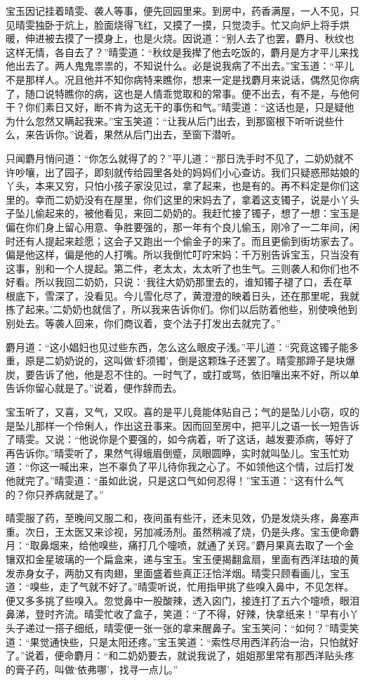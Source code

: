 \documentclass[12pt,oneside]{book}
\begin{document}
宝玉因记挂着晴雯、袭人等事，便先回园里来。到房中，药香满屋，一人不见，只见晴雯独卧于炕上，脸面烧得飞红，又摸了一摸，只觉烫手。忙又向炉上将手烘暖，伸进被去摸了一摸身上，也是火烧。因说道：“别人去了也罢，麝月、秋纹也这样无情，各自去了？”晴雯道：“秋纹是我撵了他去吃饭的，麝月是方才平儿来找他出去了。两人鬼鬼祟祟的，不知说什么。必是说我病了不出去。”宝玉道：“平儿不是那样人。况且他并不知你病特来瞧你，想来一定是找麝月来说话，偶然见你病了，随口说特瞧你的病，这也是人情乖觉取和的常事。便不出去，有不是，与他何干？你们素日又好，断不肯为这无干的事伤和气。”晴雯道：“这话也是，只是疑他为什么忽然又瞒起我来。”宝玉笑道：“让我从后门出去，到那窗根下听听说些什么，来告诉你。”说着，果然从后门出去，至窗下潜听。

只闻麝月悄问道：“你怎么就得了的？”平儿道：“那日洗手时不见了，二奶奶就不许吵嚷，出了园子，即刻就传给园里各处的妈妈们小心查访。我们只疑惑邢姑娘的丫头，本来又穷，只怕小孩子家没见过，拿了起来，也是有的。再不料定是你们这里的。幸而二奶奶没有在屋里，你们这里的宋妈去了，拿着这支镯子，说是小丫头子坠儿偷起来的，被他看见，来回二奶奶的。我赶忙接了镯子，想了一想：宝玉是偏在你们身上留心用意、争胜要强的，那一年有个良儿偷玉，刚冷了一二年间，闲时还有人提起来趁愿；这会子又跑出一个偷金子的来了。而且更偷到街坊家去了。偏是他这样，偏是他的人打嘴。所以我倒忙叮咛宋妈：千万别告诉宝玉，只当没有这事，别和一个人提起。第二件，老太太，太太听了也生气。三则袭人和你们也不好看。所以我回二奶奶，只说：‘我往大奶奶那里去的，谁知镯子褪了口，丢在草根底下，雪深了，没看见。今儿雪化尽了，黄澄澄的映着日头，还在那里呢，我就拣了起来。’二奶奶也就信了，所以我来告诉你们。你们以后防着他些，别使唤他到别处去。等袭人回来，你们商议着，变个法子打发出去就完了。”

麝月道：“这小娼妇也见过些东西，怎么这么眼皮子浅。”平儿道：“究竟这镯子能多重，原是二奶奶说的，这叫做‘虾须镯’，倒是这颗珠子还罢了。晴雯那蹄子是块爆炭，要告诉了他，他是忍不住的。一时气了，或打或骂，依旧嚷出来不好，所以单告诉你留心就是了。”说着，便作辞而去。

宝玉听了，又喜，又气，又叹。喜的是平儿竟能体贴自己；气的是坠儿小窃，叹的是坠儿那样一个伶俐人，作出这丑事来。因而回至房中，把平儿之语一长一短告诉了晴雯。又说：“他说你是个要强的，如今病着，听了这话，越发要添病，等好了再告诉你。”晴雯听了，果然气得蛾眉倒蹙，凤眼圆睁，实时就叫坠儿。宝玉忙劝道：“你这一喊出来，岂不辜负了平儿待你我之心了。不如领他这个情，过后打发他就完了。”晴雯道：“虽如此说，只是这口气如何忍得！”宝玉道：“这有什么气的？你只养病就是了。”

晴雯服了药，至晚间又服二和，夜间虽有些汗，还未见效，仍是发烧头疼，鼻塞声重。次日，王太医又来诊视，另加减汤剂。虽然稍减了烧，仍是头疼。宝玉便命麝月：“取鼻烟来，给他嗅些，痛打几个嚏喷，就通了关窍。”麝月果真去取了一个金镶双扣金星玻璃的一个扁盒来，递与宝玉。宝玉便揭翻盒扇，里面有西洋珐琅的黄发赤身女子，两肋又有肉翅，里面盛着些真正汪恰洋烟。晴雯只顾看画儿，宝玉道：“嗅些，走了气就不好了。”晴雯听说，忙用指甲挑了些嗅入鼻中，不见怎样。便又多多挑了些嗅入。忽觉鼻中一股酸辣，透入囟门，接连打了五六个嚏喷，眼泪鼻涕，登时齐流。晴雯忙收了盒子，笑道：“了不得，好辣，快拿纸来！”早有小丫头子递过一搭子细纸，晴雯便一张一张的拿来醒鼻子。宝玉笑问：“如何？”晴雯笑道：“果觉通快些，只是太阳还疼。”宝玉笑道：“索性尽用西洋药治一治，只怕就好了。”说着，便命麝月：“和二奶奶要去，就说我说了，姐姐那里常有那西洋贴头疼的膏子药，叫做‘依弗哪’，找寻一点儿。”
\end{document}
